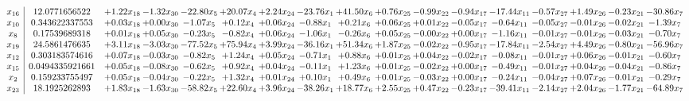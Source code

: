 \documentclass[9pt]{article}
\begin{document}
 \[\begin{array}{c| c c@{\hskip 2pt} c@{\hskip 2pt} c@{\hskip 2pt} c@{\hskip 2pt} c@{\hskip 2pt} c@{\hskip 2pt} c@{\hskip 2pt} c@{\hskip 2pt} c@{\hskip 2pt} c@{\hskip 2pt} c@{\hskip 2pt} c@{\hskip 2pt} c@{\hskip 2pt} c@{\hskip 2pt} c@{\hskip 2pt} }
 x_{16}   &  12.0771656522 & +  1.22 x_{18} & -1.32 x_{30} & -22.80 x_{5} & + 20.07 x_{4} & +  2.24 x_{24} & -23.76 x_{1} & + 41.50 x_{6} & +  0.76 x_{25} & -0.99 x_{22} & -0.94 x_{17} & -17.44 x_{11} & -0.57 x_{27} & +  1.49 x_{26} & -0.23 x_{21} & -30.86 x_{7}\\
 x_{10}   &  0.343622337553 & +  0.03 x_{18} & +  0.00 x_{30} & -1.07 x_{5} & +  0.12 x_{4} & +  0.06 x_{24} & -0.88 x_{1} & +  0.21 x_{6} & +  0.06 x_{25} & +  0.01 x_{22} & -0.05 x_{17} & -0.64 x_{11} & -0.05 x_{27} & -0.01 x_{26} & -0.02 x_{21} & -1.39 x_{7}\\
 x_{8}   &  0.17539689318 & +  0.01 x_{18} & +  0.05 x_{30} & -0.23 x_{5} & -0.82 x_{4} & +  0.06 x_{24} & -1.06 x_{1} & -0.26 x_{6} & +  0.05 x_{25} & -0.00 x_{22} & +  0.00 x_{17} & -1.16 x_{11} & -0.01 x_{27} & -0.01 x_{26} & -0.03 x_{21} & -0.70 x_{7}\\
 x_{19}   &  24.5861476635 & +  3.11 x_{18} & -3.03 x_{30} & -77.52 x_{5} & + 75.94 x_{4} & +  3.99 x_{24} & -36.16 x_{1} & + 51.34 x_{6} & +  1.87 x_{25} & -0.02 x_{22} & -0.95 x_{17} & -17.84 x_{11} & -2.54 x_{27} & +  4.49 x_{26} & -0.80 x_{21} & -56.96 x_{7}\\
 x_{12}   &  0.303183574616 & +  0.07 x_{18} & -0.03 x_{30} & -0.82 x_{5} & +  1.24 x_{4} & +  0.05 x_{24} & -0.71 x_{1} & +  0.88 x_{6} & +  0.01 x_{25} & +  0.04 x_{22} & -0.02 x_{17} & -0.08 x_{11} & -0.01 x_{27} & +  0.06 x_{26} & -0.01 x_{21} & -0.60 x_{7}\\
 x_{15}   &  0.0494335921661 & +  0.05 x_{18} & -0.08 x_{30} & -0.62 x_{5} & +  0.92 x_{4} & +  0.04 x_{24} & -0.11 x_{1} & +  1.23 x_{6} & +  0.01 x_{25} & -0.02 x_{22} & +  0.00 x_{17} & -0.49 x_{11} & -0.01 x_{27} & +  0.04 x_{26} & -0.04 x_{21} & -0.86 x_{7}\\
 x_{2}   &  0.159233755497 & +  0.05 x_{18} & -0.04 x_{30} & -0.22 x_{5} & +  1.32 x_{4} & +  0.01 x_{24} & +  0.10 x_{1} & +  0.49 x_{6} & +  0.01 x_{25} & -0.03 x_{22} & +  0.00 x_{17} & -0.24 x_{11} & -0.04 x_{27} & +  0.07 x_{26} & -0.01 x_{21} & -0.29 x_{7}\\
 x_{23}   &  18.1925262893 & +  1.83 x_{18} & -1.63 x_{30} & -58.82 x_{5} & + 22.60 x_{4} & +  3.96 x_{24} & -38.26 x_{1} & + 18.77 x_{6} & +  2.55 x_{25} & +  0.47 x_{22} & -0.23 x_{17} & -39.41 x_{11} & -2.14 x_{27} & +  2.04 x_{26} & -1.77 x_{21} & -64.89 x_{7}\\

\end{array}\]
\end{document}
